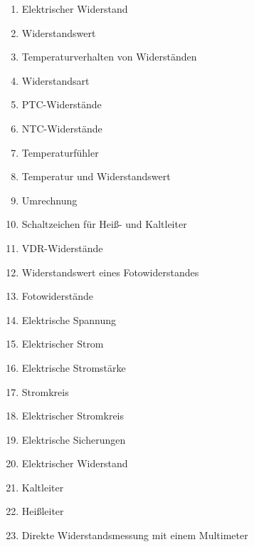 \begin{enumerate}
\item
  Elektrischer Widerstand\\
\item
  Widerstandswert\\
\item
  Temperaturverhalten von Widerständen\\
\item
  Widerstandsart\\
\item
  PTC-Widerstände\\
\item
  NTC-Widerstände\\
\item
  Temperaturfühler\\
\item
  Temperatur und Widerstandswert\\
\item
  Umrechnung\\
\item
  Schaltzeichen für Heiß- und Kaltleiter\\
\item
  VDR-Widerstände\\
\item
  Widerstandswert eines Fotowiderstandes\\
\item
  Fotowiderstände\\
\item
  Elektrische Spannung\\
\item
  Elektrischer Strom\\
\item
  Elektrische Stromstärke\\
\item
  Stromkreis\\
\item
  Elektrischer Stromkreis\\
\item
  Elektrische Sicherungen\\
\item
  Elektrischer Widerstand\\
\item
  Kaltleiter\\
\item
  Heißleiter\\
\item
  Direkte Widerstandsmessung mit einem Multimeter
\end{enumerate}


